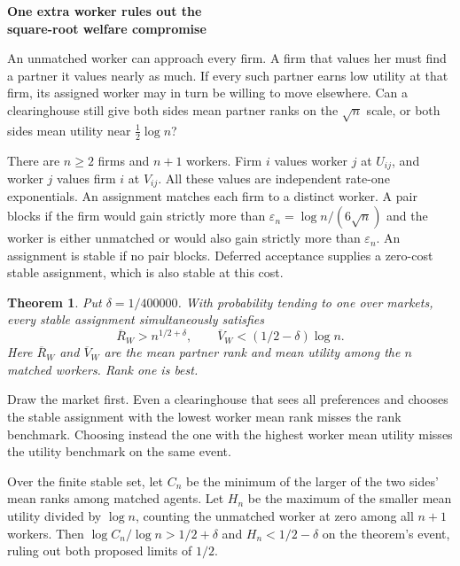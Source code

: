 \documentclass[11pt]{article}
\newtheorem{theorem}{Theorem}
\newcommand{\eps}{\varepsilon_n}
\begin{document}
\begin{center}
{\LARGE\bfseries One extra worker rules out the\\[2pt] square-root welfare compromise}
\end{center}

An unmatched worker can approach every firm. A firm that values her must
find a partner it values nearly as much. If every such partner earns low
utility at that firm, its assigned worker may in turn be willing to move
elsewhere. Can a clearinghouse still give both sides mean partner ranks
on the $\sqrt n$ scale, or both sides mean utility near $\tfrac12\log n$?

There are $n\ge2$ firms and $n+1$ workers. Firm $i$ values worker $j$ at $U_{ij}$,
and worker $j$ values firm $i$ at $V_{ij}$. All these values are independent
rate-one exponentials. An assignment matches each firm to a distinct worker.
A pair blocks if the firm would gain strictly more than
$\eps=\log n/(6\sqrt n)$ and the worker is either unmatched or would also
gain strictly more than $\eps$. An assignment is stable if no pair blocks.
Deferred acceptance supplies a zero-cost stable assignment, which is also
stable at this cost.

\begin{theorem}\label{thm:main}
Put $\delta=1/400000$. With probability tending to one over markets,
every stable assignment simultaneously satisfies
\[
  \overline R_W>n^{1/2+\delta},
  \qquad
  \overline V_W<(1/2-\delta)\log n .
\]
Here $\overline R_W$ and $\overline V_W$ are the mean partner rank and
mean utility among the $n$ matched workers. Rank one is best.
\end{theorem}

Draw the market first. Even a clearinghouse that sees all preferences and
chooses the stable assignment with the lowest worker mean rank misses the rank
benchmark. Choosing instead the one with the highest worker mean utility misses
the utility benchmark on the same event.

Over the finite stable set, let $C_n$ be the minimum of the larger of the two
sides' mean ranks among matched agents. Let $H_n$ be the maximum of the smaller
mean utility divided by $\log n$, counting the unmatched worker at zero among
all $n+1$ workers. Then $\log C_n/\log n>1/2+\delta$ and $H_n<1/2-\delta$ on
the theorem's event, ruling out both proposed limits of $1/2$.
\end{document}
